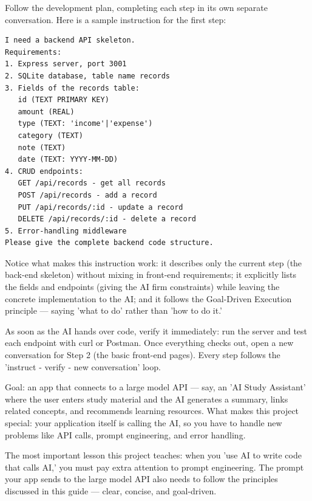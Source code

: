 
Follow the development plan, completing each step in its own separate conversation. Here is a sample instruction for the first step:

\begin{lstlisting}
I need a backend API skeleton.
Requirements:
1. Express server, port 3001
2. SQLite database, table name records
3. Fields of the records table:
   id (TEXT PRIMARY KEY)
   amount (REAL)
   type (TEXT: 'income'|'expense')
   category (TEXT)
   note (TEXT)
   date (TEXT: YYYY-MM-DD)
4. CRUD endpoints:
   GET /api/records - get all records
   POST /api/records - add a record
   PUT /api/records/:id - update a record
   DELETE /api/records/:id - delete a record
5. Error-handling middleware
Please give the complete backend code structure.
\end{lstlisting}

Notice what makes this instruction work: it describes only the current step (the back-end skeleton) without mixing in front-end requirements; it explicitly lists the fields and endpoints (giving the AI firm constraints) while leaving the concrete implementation to the AI; and it follows the Goal-Driven Execution principle — saying 'what to do' rather than 'how to do it.'

As soon as the AI hands over code, verify it immediately: run the server and test each endpoint with curl or Postman. Once everything checks out, open a new conversation for Step 2 (the basic front-end pages). Every step follows the 'instruct - verify - new conversation' loop.



Goal: an app that connects to a large model API — say, an 'AI Study Assistant' where the user enters study material and the AI generates a summary, links related concepts, and recommends learning resources. What makes this project special: your application itself is calling the AI, so you have to handle new problems like API calls, prompt engineering, and error handling.

The most important lesson this project teaches: when you 'use AI to write code that calls AI,' you must pay extra attention to prompt engineering. The prompt your app sends to the large model API also needs to follow the principles discussed in this guide — clear, concise, and goal-driven.

